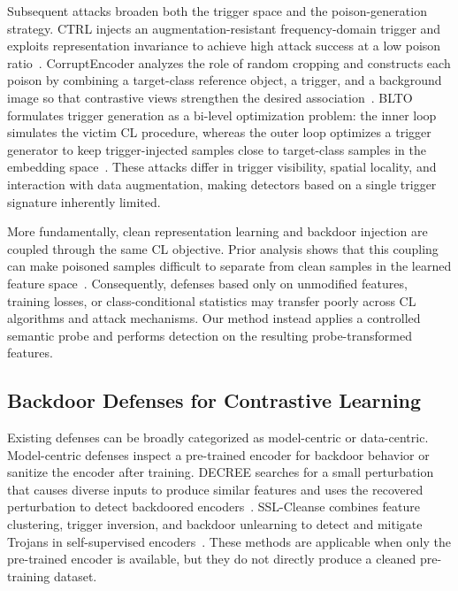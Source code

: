 \documentclass[10pt,journal]{IEEEtran}
\begin{document}
Subsequent attacks broaden both the trigger space and the poison-generation strategy. CTRL injects an augmentation-resistant frequency-domain trigger and exploits representation invariance to achieve high attack success at a low poison ratio~\cite{Li2023CTRL}. CorruptEncoder analyzes the role of random cropping and constructs each poison by combining a target-class reference object, a trigger, and a background image so that contrastive views strengthen the desired association~\cite{Zhang2024CorruptEncoder}. BLTO formulates trigger generation as a bi-level optimization problem: the inner loop simulates the victim CL procedure, whereas the outer loop optimizes a trigger generator to keep trigger-injected samples close to target-class samples in the embedding space~\cite{Sun2024BLTO}. These attacks differ in trigger visibility, spatial locality, and interaction with data augmentation, making detectors based on a single trigger signature inherently limited.

More fundamentally, clean representation learning and backdoor injection are coupled through the same CL objective. Prior analysis shows that this coupling can make poisoned samples difficult to separate from clean samples in the learned feature space~\cite{Li2024Difficulty}. Consequently, defenses based only on unmodified features, training losses, or class-conditional statistics may transfer poorly across CL algorithms and attack mechanisms. Our method instead applies a controlled semantic probe and performs detection on the resulting probe-transformed features.

\subsection{Backdoor Defenses for Contrastive Learning}
Existing defenses can be broadly categorized as model-centric or data-centric. Model-centric defenses inspect a pre-trained encoder for backdoor behavior or sanitize the encoder after training. DECREE searches for a small perturbation that causes diverse inputs to produce similar features and uses the recovered perturbation to detect backdoored encoders~\cite{Feng2023DECREE}. SSL-Cleanse combines feature clustering, trigger inversion, and backdoor unlearning to detect and mitigate Trojans in self-supervised encoders~\cite{Zheng2024SSLCleanse}. These methods are applicable when only the pre-trained encoder is available, but they do not directly produce a cleaned pre-training dataset.
\end{document}
